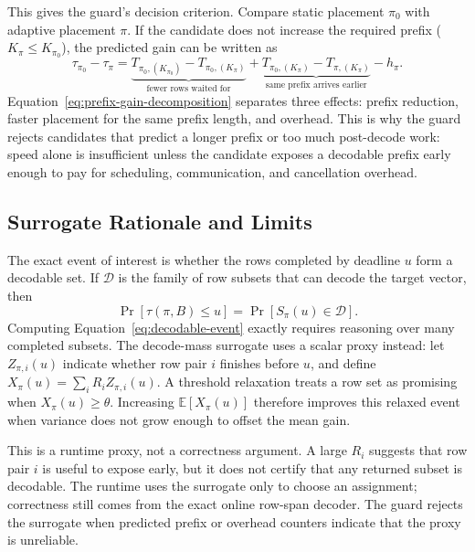 This gives the guard's decision criterion.  Compare static placement $\pi_0$
with adaptive placement $\pi$.  If the candidate does not increase the required
prefix ($K_\pi\le K_{\pi_0}$), the predicted gain can be written as
\begin{equation}
  \label{eq:prefix-gain-decomposition}
  \tau_{\pi_0}-\tau_\pi
  =
  \underbrace{T_{\pi_0,(K_{\pi_0})}-T_{\pi_0,(K_\pi)}}_{\text{fewer rows waited for}}
  +
  \underbrace{T_{\pi_0,(K_\pi)}-T_{\pi,(K_\pi)}}_{\text{same prefix arrives earlier}}
  -
  h_\pi .
\end{equation}
Equation~\eqref{eq:prefix-gain-decomposition} separates three effects: prefix
reduction, faster placement for the same prefix length, and overhead.  This is
why the guard rejects candidates that predict a longer prefix or too much
post-decode work: speed alone is insufficient unless the candidate exposes a
decodable prefix early enough to pay for scheduling, communication, and
cancellation overhead.

\subsection{Surrogate Rationale and Limits}

The exact event of interest is whether the rows completed by deadline $u$ form a
decodable set.  If $\mathcal{D}$ is the family of row subsets that can decode
the target vector, then
\begin{equation}
  \label{eq:decodable-event}
  \Pr[\tau(\pi,B) \le u]
  =
  \Pr[S_\pi(u) \in \mathcal{D}].
\end{equation}
Computing Equation~\eqref{eq:decodable-event} exactly requires reasoning over
many completed
subsets.  The decode-mass surrogate uses a scalar proxy instead: let
$Z_{\pi,i}(u)$ indicate whether row pair $i$ finishes before $u$, and define
$X_\pi(u)=\sum_i R_i Z_{\pi,i}(u)$.  A threshold relaxation treats a row set as
promising when $X_\pi(u)\ge\theta$.  Increasing
$\mathbb{E}[X_\pi(u)]$ therefore improves this relaxed event when variance does
not grow enough to offset the mean gain.

This is a runtime proxy, not a correctness argument.  A large $R_i$ suggests
that row pair $i$ is useful to expose early, but it does not certify that any
returned subset is decodable.  The runtime uses the surrogate only to choose an
assignment; correctness still comes from the exact online row-span decoder.  The
guard rejects the surrogate when predicted prefix or overhead counters indicate
that the proxy is unreliable.
